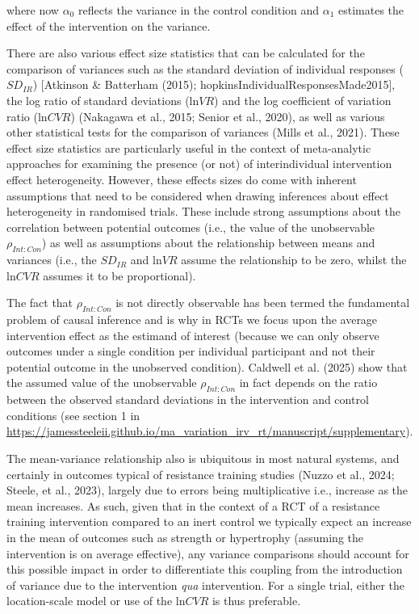 \documentclass[
]{article}
\begin{document}
where now \(\alpha_0\) reflects the variance in the control condition
and \(\alpha_1\) estimates the effect of the intervention on the
variance.

There are also various effect size statistics that can be calculated for
the comparison of variances such as the standard deviation of individual
responses (\(SD_{IR}\)) {[}Atkinson \& Batterham (2015);
hopkinsIndividualResponsesMade2015{]}, the log ratio of standard
deviations (\(\text{ln}VR\)) and the log coefficient of variation ratio
(\(\text{ln}CVR\)) (Nakagawa et al., 2015; Senior et al., 2020), as well
as various other statistical tests for the comparison of variances
(Mills et al., 2021). These effect size statistics are particularly
useful in the context of meta-analytic approaches for examining the
presence (or not) of interindividual intervention effect heterogeneity.
However, these effects sizes do come with inherent assumptions that need
to be considered when drawing inferences about effect heterogeneity in
randomised trials. These include strong assumptions about the
correlation between potential outcomes (i.e., the value of the
unobservable \(\rho_{Int:Con}\)) as well as assumptions about the
relationship between means and variances (i.e., the \(SD_{IR}\) and
\(\text{ln}VR\) assume the relationship to be zero, whilst the
\(\text{ln}CVR\) assumes it to be proportional).

The fact that \(\rho_{Int:Con}\) is not directly observable has been
termed the fundamental problem of causal inference and is why in RCTs we
focus upon the average intervention effect as the estimand of interest
(because we can only observe outcomes under a single condition per
individual participant and not their potential outcome in the unobserved
condition). Caldwell et al. (2025) show that the assumed value of the
unobservable \(\rho_{Int:Con}\) in fact depends on the ratio between the
observed standard deviations in the intervention and control conditions
(see section 1 in
\url{https://jamessteeleii.github.io/ma_variation_irv_rt/manuscript/supplementary}).

The mean-variance relationship also is ubiquitous in most natural
systems, and certainly in outcomes typical of resistance training
studies (Nuzzo et al., 2024; {Steele, et al.}, 2023), largely due to
errors being multiplicative i.e., increase as the mean increases. As
such, given that in the context of a RCT of a resistance training
intervention compared to an inert control we typically expect an
increase in the mean of outcomes such as strength or hypertrophy
(assuming the intervention is on average effective), any variance
comparisons should account for this possible impact in order to
differentiate this coupling from the introduction of variance due to the
intervention \emph{qua} intervention. For a single trial, either the
location-scale model or use of the \(\text{ln}CVR\) is thus preferable.
\end{document}
